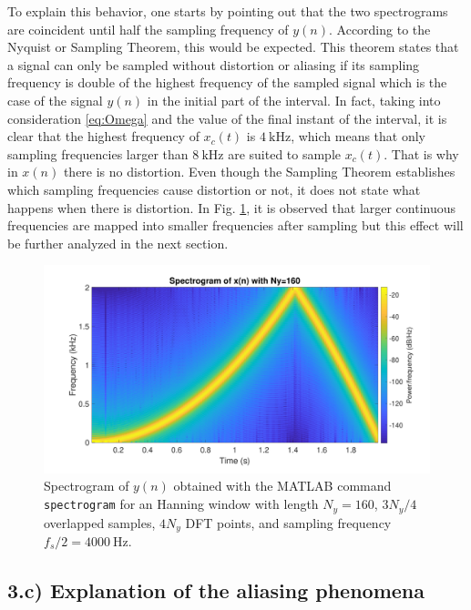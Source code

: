 \documentclass[a4paper, oneside, 11pt]{article}
\begin{document}
To explain this behavior, one starts by pointing out that the two spectrograms are coincident until half the sampling frequency of $y(n)$. According to the Nyquist or Sampling Theorem, this would be expected. This theorem states that a signal can only be sampled without distortion or aliasing if its sampling frequency is double of the highest frequency of the sampled signal which is the case of the signal $y(n)$ in the initial part of the interval. In fact, taking into consideration \eqref{eq:Omega} and the value of the final instant of the interval, it is clear that the highest frequency of $x_c(t)$ is $\SI{4}{\kilo \hertz}$, which means that only sampling frequencies larger than $\SI{8}{\kilo \hertz}$ are suited to sample $x_c(t)$. That is why in $x(n)$ there is no distortion. Even though the Sampling Theorem establishes which sampling frequencies cause distortion or not, it does not state what happens when there is distortion. In Fig. \ref{fig:spectrogram_y}, it is observed that larger continuous frequencies are mapped into smaller frequencies after sampling but this effect will be further analyzed in the next section.

\begin{figure}[h!]
    \centering
    \includegraphics[width = 0.8 \textwidth]{figures/spectrogram_y.pdf}
    \caption{Spectrogram of $y(n)$ obtained with the MATLAB{\texttrademark} command \texttt{spectrogram} for an Hanning window with length $N_y = 160$, $3N_y/4$ overlapped samples, $4 N_y$ DFT points, and sampling frequency $f_s/2 = \SI{4000}{\hertz}$.}
    \label{fig:spectrogram_y}
\end{figure}

\subsection{3.c) Explanation of the aliasing phenomena}\label{sec:3c}
\end{document}

